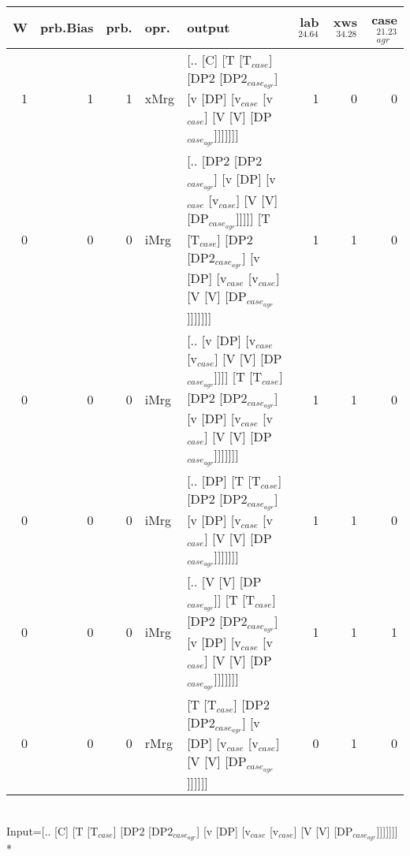 \begin{tabularx}{\linewidth}{rrrlXrrr}
\hline
   W &   prb.Bias &   prb. & opr.   & output                                                                                                                                                        &   lab$^{24.64}$ &   xws$^{34.28}$ &   case$_{agr}^{21.23}$ \\
\hline
   1 &       1 &   1 & xMrg & [.. [C] [T [T$_{case}$] [DP2 [DP2$_{case_{agr}}$] [v [DP] [v$_{case}$ [v$_{case}$] [V [V] [DP$_{case_{agr}}$]]]]]]]                                                                   &             1 &             0 &                  0 \\
   0 &       0 &   0 & iMrg & [.. [DP2 [DP2$_{case_{agr}}$] [v [DP] [v$_{case}$ [v$_{case}$] [V [V] [DP$_{case_{agr}}$]]]]] [T [T$_{case}$] [DP2 [DP2$_{case_{agr}}$] [v [DP] [v$_{case}$ [v$_{case}$] [V [V] [DP$_{case_{agr}}$]]]]]]] &             1 &             1 &                  0 \\
   0 &       0 &   0 & iMrg & [.. [v [DP] [v$_{case}$ [v$_{case}$] [V [V] [DP$_{case_{agr}}$]]]] [T [T$_{case}$] [DP2 [DP2$_{case_{agr}}$] [v [DP] [v$_{case}$ [v$_{case}$] [V [V] [DP$_{case_{agr}}$]]]]]]]                      &             1 &             1 &                  0 \\
   0 &       0 &   0 & iMrg & [.. [DP] [T [T$_{case}$] [DP2 [DP2$_{case_{agr}}$] [v [DP] [v$_{case}$ [v$_{case}$] [V [V] [DP$_{case_{agr}}$]]]]]]]                                                                  &             1 &             1 &                  0 \\
   0 &       0 &   0 & iMrg & [.. [V [V] [DP$_{case_{agr}}$]] [T [T$_{case}$] [DP2 [DP2$_{case_{agr}}$] [v [DP] [v$_{case}$ [v$_{case}$] [V [V] [DP$_{case_{agr}}$]]]]]]]                                                 &             1 &             1 &                  1 \\
   0 &       0 &   0 & rMrg & [T [T$_{case}$] [DP2 [DP2$_{case_{agr}}$] [v [DP] [v$_{case}$ [v$_{case}$] [V [V] [DP$_{case_{agr}}$]]]]]]                                                                            &             0 &             1 &                  0 \\
\hline
\end{tabularx}\endgroup\\
\begingroup\scriptsize Input=[.. [C] [T [T$_{case}$] [DP2 [DP2$_{case_{agr}}$] [v [DP] [v$_{case}$ [v$_{case}$] [V [V] [DP$_{case_{agr}}$]]]]]]]\\*
